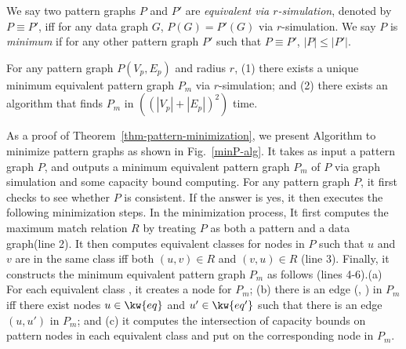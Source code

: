 We say two pattern graphs $P$ and $P'$ are {\em equivalent via $r$-simulation}, denoted by $P\equiv P'$, iff for any data graph $G$, $P(G) = P'(G)$ via $r$-simulation. We say $P$ is {\em minimum} if for any other pattern graph $P'$ such that $P\equiv P'$, $|P|\leq |P'|$.


\begin{theorem}
\label{thm-pattern-minimization-ap}
For any pattern graph $P(V_p, E_p)$ and radius $r$, (1) there exists a unique minimum equivalent pattern graph $P_m$ via $r$-simulation;
and (2) there exists an algorithm that finds $P_m$ in $((|V_p|+|E_p|)^2)$ time.
\end{theorem}



 As a proof of Theorem~\ref{thm-pattern-minimization}, we present Algorithm \minp to minimize pattern graphs as shown in Fig.~\ref{minP-alg}. It takes as input a pattern graph $P$, and outputs a minimum equivalent pattern graph $P_m$ of $P$ via graph simulation and some capacity bound computing. For any pattern graph $P$, it first checks to see whether $P$ is consistent. If the answer is yes, it then executes the following minimization steps. In the minimization process, It first computes the maximum match relation $R$ by treating $P$ as both a pattern and a data graph(line 2). It then computes equivalent classes for nodes in $P$ such that $u$ and $v$ are in the same class iff both $(u, v)\in R$ and $(v, u)\in R$ (line 3). Finally, it constructs the minimum equivalent pattern graph $P_m$ as follows (lines 4-6).(a) For each equivalent class , it creates a node  for $P_m$; (b) there is an edge (, ) in $P_m$ iff there exist nodes $u \in \kw{eq}$ and $u' \in \kw{eq'}$ such that there is an edge $(u, u')$ in $P_m$; and (c) it computes the intersection of capacity bounds on pattern nodes in each equivalent class  and put on the corresponding node  in $P_m$.



